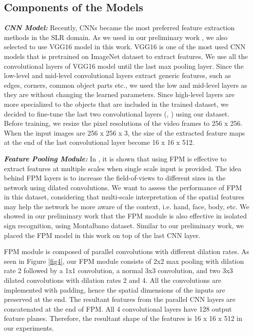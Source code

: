 \documentclass[11pt, a4paper, singlecolumn]{article}
\begin{document}
\subsection{Components of the Models}
\label{sec:components_models}
\textit{\textbf{CNN Model: }} Recently, CNNs became the most preferred feature extraction methods in the SLR domain. As we used in our preliminary work \cite{sincan2019isolated, tur2019isolated}, we also selected to use VGG16 model \cite{simonyan2014very} in this work. VGG16 is one of the most used CNN models that is pretrained on ImageNet \cite{russakovsky2015imagenet} dataset to extract features. We use all the convolutional layers of VGG16 model until the last max pooling layer. Since the low-level and mid-level convolutional layers extract generic features, such as edges, corners, common object parts etc., we used the low and mid-level layers as they are without changing the learned parameters. Since high-level layers are more specialized to the objects that are included in the trained dataset, we decided to fine-tune the last two convolutional layers (, ) using our dataset. Before training, we resize the pixel resolutions of the video frames to 256 x 256. When the input images are 256 x 256 x 3, the size of the extracted feature maps at the end of the last convolutional layer become 16 x 16 x 512. 

\textit{\textbf{Feature Pooling Module: }} In \cite{lim2018foreground}, it is shown that using FPM is effective to extract features at multiple scales when single scale input is provided. The idea behind FPM layers is to increase the field-of-views to different sizes in the network using dilated convolutions. We want to assess the performance of FPM in this dataset, considering that multi-scale interpretation of the spatial features may help the network be more aware of the context, i.e. hand, face, body, etc. We showed in our preliminary work \cite{sincan2019isolated} that the FPM module is also effective in isolated sign recognition, using Montalbano dataset. Similar to our preliminary work, we placed the FPM model in this work on top of the last CNN layer. 

FPM module is composed of parallel convolutions with different dilation rates. As seen in Figure \ref{fig4}, our FPM module consists of 2x2 max pooling with dilation rate 2 followed by a 1x1 convolution, a normal 3x3 convolution, and two 3x3 dilated convolutions with dilation rates 2 and 4. All the convolutions are implemented with padding, hence the spatial dimensions of the inputs are preserved at the end. The resultant features from the parallel CNN layers are concatenated at the end of FPM. All 4 convolutional layers have 128 output feature planes. Therefore, the resultant shape of the features is 16 x 16 x 512 in our experiments.
\end{document}
